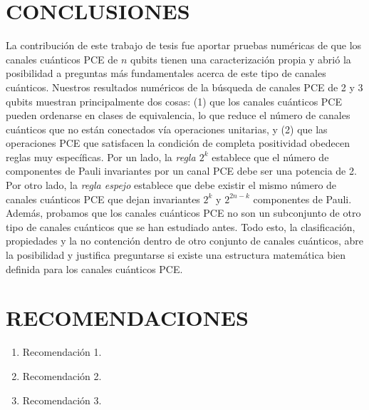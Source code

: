 

\chapter{CONCLUSIONES}
La contribución de este trabajo de tesis fue aportar pruebas numéricas
de que los canales cuánticos PCE de $n$ qubits tienen una caracterización propia 
y abrió la posibilidad a preguntas más fundamentales acerca de este 
tipo de canales cuánticos.
Nuestros resultados numéricos de la búsqueda de canales PCE de 2 y 3 qubits 
muestran principalmente dos cosas: (1) que los canales cuánticos PCE pueden 
ordenarse en clases de equivalencia, lo que reduce el número de canales cuánticos
que no están conectados vía operaciones unitarias, y (2) que las operaciones
PCE que satisfacen la condición de completa positividad obedecen reglas muy
específicas. 
Por un lado, 
la \textit{regla $2^k$} establece que el número de 
componentes de Pauli invariantes por un canal PCE debe ser una potencia de 2. 
Por otro lado, la \textit{regla espejo} establece que debe existir el mismo número de 
canales cuánticos PCE que dejan invariantes $2^k$ y $2^{2n-k}$ componentes 
de Pauli. Además, probamos que los canales cuánticos PCE no son un subconjunto
de otro tipo de canales cuánticos que se han estudiado antes. Todo esto, la clasificación,
propiedades y la no contención dentro de otro conjunto de canales cuánticos, 
abre la posibilidad y justifica preguntarse si existe una estructura matemática bien 
definida para los canales cuánticos PCE.

\chapter{RECOMENDACIONES}
\begin{enumerate}
	\item Recomendación 1.
	\item Recomendación 2.
	\item Recomendación 3.
\end{enumerate}
